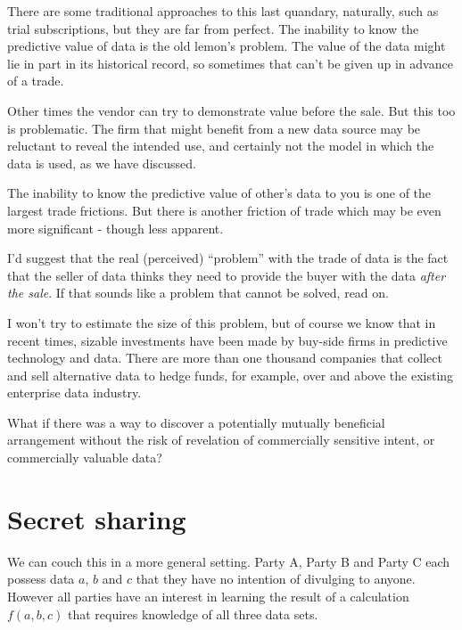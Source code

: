 There are some traditional approaches to this last quandary, naturally, such as trial subscriptions, but they are far from perfect. The inability to know the predictive value of data is the old lemon's problem. The value of the data might lie in part in its historical record, so sometimes that can't be given up in advance of a trade. 


Other times the vendor can try to demonstrate value before the sale. But this too is problematic. The firm that might benefit from a new data source may be reluctant to reveal the intended use, and certainly not the model in which the data is used, as we have discussed. 

The inability to know the predictive value of other's data to you is one of the largest trade frictions. But there is another friction of trade which may be even more significant - though less apparent. 

I'd suggest that the real (perceived) ``problem'' with the trade of data is the fact that the seller of data thinks they need to provide the buyer with the data {\em after the sale}. If that sounds like a problem that cannot be solved, read on. 

I won't try to estimate the size of this problem, but of course we know that in recent times, sizable investments have been made by buy-side firms in predictive technology and data. There are more than one thousand companies that collect and sell alternative data to hedge funds, for example, over and above the existing enterprise data industry. 


What if there was a way to discover a potentially mutually beneficial arrangement without the risk of revelation of commercially sensitive intent, or commercially valuable data? 

\section{Secret sharing}

We can couch this in a more general setting. Party A, Party B and Party C each possess data $a$, $b$ and $c$ that they have no intention of divulging to anyone. However all parties have an interest in learning the result of a calculation $f(a,b,c)$ that requires knowledge of all three data sets. 

